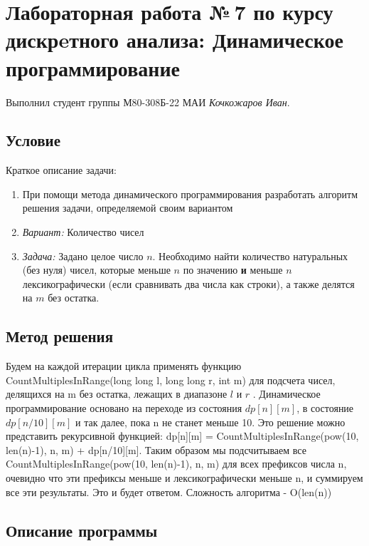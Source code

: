 \documentclass[12pt]{article}
\begin{document}
\section*{Лабораторная работа №\,7 по курсу дискрeтного анализа: Динамическое программирование}

Выполнил студент группы М80-308Б-22 МАИ \textit{Кочкожаров Иван}.

\subsection*{Условие}

Краткое описание задачи:
\begin{enumerate}
    \item При помощи метода динамического программирования разработать алгоритм решения задачи, определяемой
    своим вариантом
    \item \textit{Вариант:} Количество чисел
    \item \textit{Задача:} Задано целое число $n$. Необходимо найти количество натуральных (без нуля) чисел, которые меньше $n$ по значению \textbf{и} меньше $n$ лексикографически (если сравнивать два числа как строки), а также делятся на $m$ без остатка.
\end{enumerate}

\subsection*{Метод решения}

Будем на каждой итерации цикла применять функцию CountMultiplesInRange(long long l, long long r, int m) для подсчета чисел, делящихся на m без остатка, лежащих в диапазоне $l$ и $r$ . Динамическое программирование основано на переходе из состояния $dp[n][m]$, в состояние $dp[n/10][m]$ и так далее, пока n не станет меньше 10. 
Это решение можно представить рекурсивной функцией: dp[n][m] = CountMultiplesInRange(pow(10, len(n)-1), n, m) + dp[n/10][m]. Таким образом мы подсчитываем все CountMultiplesInRange(pow(10, len(n)-1), n, m) для всех префиксов числа n, очевидно что эти префиксы меньше и лексикографически меньше n, и суммируем все эти результаты. Это и будет ответом.
Сложность алгоритма - O(len(n))

\subsection*{Описание программы}
\end{document}
